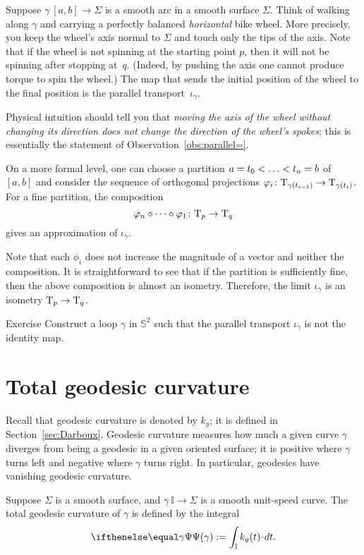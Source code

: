 Suppose $\gamma\:[a,b]\to\Sigma$ is a smooth arc in a smooth surface $\Sigma$.
Think of walking along $\gamma$ and carrying a perfectly balanced \textit{horizontal} bike wheel.
More precisely, you keep the wheel's axis normal to $\Sigma$ and touch only the tips of the axis.
Note that if the wheel is not spinning at the starting point $p$, then it will not be spinning after stopping at~$q$.
(Indeed, by pushing the axis one cannot produce torque to spin the wheel.)
The map that sends the initial position of the wheel to the final position is the parallel transport~$\iota_\gamma$.

Physical intuition should tell you that \textit{moving the axis of the wheel without changing its direction does not change the direction of the wheel's spokes};
this is essentially the statement of Observation~\ref{obs:parallel=}.

On a more formal level, one can choose a partition $a=t_0<\dots\z<t_n=b$ of $[a,b]$
and consider the sequence of orthogonal projections $\varphi_i\colon\mathrm{T}_{\gamma(t_{i-1})}\to\mathrm{T}_{\gamma(t_i)}$.
For a fine partition, the composition 
\[\phi_n\circ\dots\circ\phi_1\:\T_p\z\to\T_q\]
gives an approximation of $\iota_\gamma$.

Note that each $\phi_i$ does not increase the magnitude of a vector and neither the composition.
It is straightforward to see that if the partition is sufficiently fine, then the above composition is almost an isometry.
Therefore, the limit $\iota_\gamma$ is an isometry $\T_p\z\to\T_q$.

\begin{thm}{Exercise}\label{ex:holonomy=not0}
Construct a loop $\gamma$ in $\mathbb{S}^2$ such that the parallel transport $\iota_\gamma$ is not the identity map.
\end{thm}

\section{Total geodesic curvature}

Recall that geodesic curvature is denoted by $k_g$;
it is defined in Section~\ref{sec:Darboux}.
Geodesic curvature measures how much a given curve $\gamma$ diverges from being a geodesic in a given oriented surface;
it is positive where $\gamma$ turns left and negative where $\gamma$ turns right.
In particular, geodesics have vanishing geodesic curvature.

Suppose $\Sigma$ is a smooth surface, and $\gamma\:\mathbb{I}\to \Sigma$ is a smooth unit-speed curve.
The total geodesic curvature of $\gamma$ is defined by the integral 
\[\tgc\gamma
\df
\int_{\mathbb{I}} k_g(t)\cdot dt.\]

